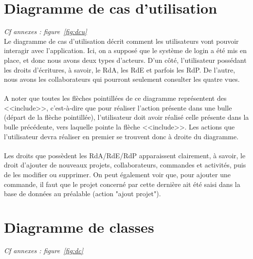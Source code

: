 \documentclass[french]{report}
\begin{document}
  \section{Diagramme de cas d'utilisation}
  \emph{Cf annexes : figure~\ref{fig:dcu}}\\

  Le diagramme de cas d’utilisation décrit comment les utilisateurs vont pouvoir
interagir avec l’application. Ici, on a supposé que le système de login a été
mis en place, et donc nous avons deux types d’acteurs. D’un côté, l’utilisateur
possédant les droits d’écritures, à savoir, le RdA, les RdE et parfois les RdP.
De l’autre, nous avons les collaborateurs qui pourront seulement consulter les
quatre vues.\\\\ A noter que toutes les flèches pointillées de ce diagramme
représentent des <<include>>, c’est-à-dire que pour réaliser l’action présente
dans une bulle (départ de la flèche pointillée), l’utilisateur doit avoir
réalisé celle présente dans la bulle précédente, vers laquelle pointe la flèche
<<include>>. Les actions que l’utilisateur devra réaliser en premier se trouvent
donc à droite du diagramme.\\\\ Les droits que possèdent les RdA/RdE/RdP
apparaissent clairement, à savoir, le droit d’ajouter de nouveaux projets,
collaborateurs, commandes et activités, puis de les modifier ou supprimer. On
peut également voir que, pour ajouter une commande, il faut que le projet
concerné par cette dernière ait été saisi dans la base de données au préalable
(action "ajout projet").

  \section{Diagramme de classes}
  \emph{Cf annexes : figure~\ref{fig:dc}}\\
\end{document}
